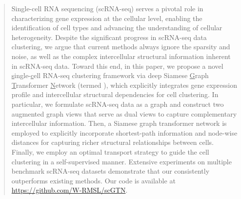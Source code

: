 \begin{abstract}
Single-cell RNA sequencing (scRNA-seq) serves a pivotal role in characterizing gene expression at the cellular level, enabling the identification of cell types and advancing the understanding of cellular heterogeneity. Despite the significant progress in scRNA-seq data clustering, we argue that current methods always ignore the sparsity and noise, as well as the complex intercellular structural information inherent in scRNA-seq data. Toward this end, in this paper, we propose a novel \underline{s}ingle-\underline{c}ell RNA-seq clustering framework via deep Siamese \underline{G}raph \underline{T}ransformer \underline{N}etwork (termed \method{}), which explicitly integrates gene expression profile and intercellular structural dependencies for cell clustering. In particular, we formulate scRNA-seq data as a graph and construct two augmented graph views that serve as dual views to capture complementary intercellular information. Then, a Siamese graph transformer network is employed to explicitly incorporate shortest-path information and node-wise distances for capturing richer structural relationships between cells. Finally, we employ an optimal transport strategy to guide the cell clustering in a self-supervised manner. Extensive experiments on multiple benchmark scRNA-seq datasets demonstrate that our \method{} consistently outperforms existing methods. Our code is available at \href{https://github.com/W-RMSL/scGTN}{https://github.com/W-RMSL/scGTN}.
\end{abstract}